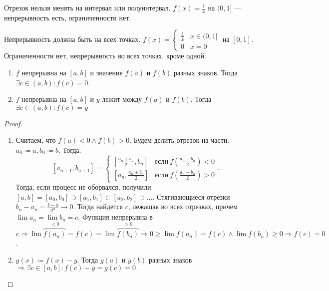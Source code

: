 \begin{remark}
    Отрезок нельзя менять на интервал или полуинтервал. $f(x) = \frac{1}{x}$ на $(0, 1]$ --- непрерывность есть, ограниченности нет.
\end{remark}
\begin{remark}
    Непрерывность должна быть на всех точках. $f(x) = \begin{cases} \frac{1}{x} & x \in (0, 1] \\ 0 & x = 0\end{cases}$ на $[0, 1]$. Ограниченности нет, непрерывность во всех точках, кроме одной. 
\end{remark}
\begin{theorem}
    \slashn
    \begin{enumerate}
        \item $f$ непрерывна на  $[a, b]$ и значение  $f(a)$ и  $f(b)$ разных знаков. Тогда  $\exists c \in (a, b)\!: f(c) = 0$.
        \item $f$ непрерывна на  $[a, b]$ и  $y$ лежит между  $f(a)$ и $f(b)$. Тогда  $\exists c \in (a, b)\!: f(c) = y$ 
    \end{enumerate}
\end{theorem}
\begin{proof}
    \slashn
    \begin{enumerate}
        \item Считаем, что $f(a) < 0 \land f(b) > 0$. Будем делить отрезок на части. $a_0 \coloneqq a, b_0 \coloneqq b$. Тогда: \[
        [a_{n+1}, b_{n+1}] = \begin{cases} 
            [\frac{a_n+b_n}{2}, b_n] & \text{если}\ f(\frac{a_n + b_n}{2}) < 0 \\
            [a_n, \frac{a_n+b_n}{2}] & \text{если}\ f(\frac{a_n + b_n}{2}) > 0
        \end{cases}
    .\] 
    Тогда, если процесс не оборвался, получили $[a, b] = [a_0,b_0] \supset [a_1, b_1] \subset [a_2, b_2] \supset \ldots$. Стягивающиеся отрезки $b_n - a_n = \frac{b-a}{2^n} \to 0$. Тогда найдется $c$, лежащая во всех отрезках, причем  $\lim a_n = \lim b_n = c$. Функция непрерывна в  $c \Rightarrow \lim \overbrace{f(a_n)}^{<0} = f(c) = \lim \overbrace{f(b_n)}^{>0} \Rightarrow 0 \ge \lim f(a_n) = f(c) \land \lim f(b_n) \ge 0 \Rightarrow f(c) = 0$.
\item $g(x) \coloneqq f(x) - y$. Тогда $g(a)$ и $g(b)$ разных знаков  $\Rightarrow \exists c \in [a, b]\!:f(c) - y = g(c) = 0$
        \end{enumerate}
\end{proof}
